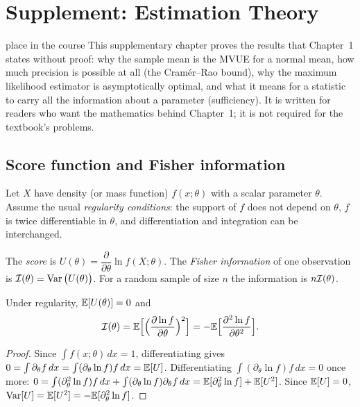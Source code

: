 \chapter{Supplement: Estimation Theory}

\begin{nuance}{place in the course}
This supplementary chapter proves the results that Chapter~1 states without proof: why the sample mean is the MVUE for a normal mean, how much precision is possible at all (the Cram\'er--Rao bound), why the maximum likelihood estimator is asymptotically optimal, and what it means for a statistic to carry all the information about a parameter (sufficiency). It is written for readers who want the mathematics behind Chapter~1; it is not required for the textbook's problems.
\end{nuance}

\section{Score function and Fisher information}

Let $X$ have density (or mass function) $f(x;\theta)$ with a scalar parameter $\theta$. Assume the usual \emph{regularity conditions}: the support of $f$ does not depend on $\theta$, $f$ is twice differentiable in $\theta$, and differentiation and integration can be interchanged.

\begin{definition}
The \emph{score} is $U(\theta)=\dfrac{\partial}{\partial\theta}\ln f(X;\theta)$. The \emph{Fisher information} of one observation is $\mathcal{I}(\theta)=\operatorname{Var}\big(U(\theta)\big)$. For a random sample of size $n$ the information is $n\mathcal{I}(\theta)$.
\end{definition}

\begin{theorem}\label{thm:score}
Under regularity, $\mathbb{E}[U(\theta)]=0$ and
\[ \mathcal{I}(\theta)=\mathbb{E}\Big[\Big(\frac{\partial\ln f}{\partial\theta}\Big)^2\Big]=-\mathbb{E}\Big[\frac{\partial^2\ln f}{\partial\theta^2}\Big]. \]
\end{theorem}

\begin{proof}
Since $\int f(x;\theta)\,dx=1$, differentiating gives $0=\int\partial_\theta f\,dx=\int(\partial_\theta\ln f)f\,dx=\mathbb{E}[U]$. Differentiating $\int(\partial_\theta\ln f)f\,dx=0$ once more: $0=\int(\partial_\theta^2\ln f)f\,dx+\int(\partial_\theta\ln f)\partial_\theta f\,dx=\mathbb{E}[\partial_\theta^2\ln f]+\mathbb{E}[U^2]$. Since $\mathbb{E}[U]=0$, $\operatorname{Var}[U]=\mathbb{E}[U^2]=-\mathbb{E}[\partial_\theta^2\ln f]$.
\end{proof}

